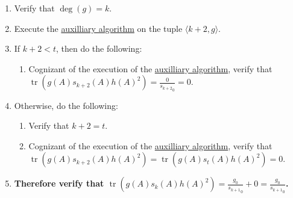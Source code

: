 \documentclass[twocolumn]{article}
\DeclareMathOperator{\tr}{tr}
\begin{document}
\begin{enumerate}
\begin{enumerate}
						\item Verify that $\deg(g)=k$.
						\item Execute the \hyperref[sec:algorithm 47 auxilliary algorithm]{auxilliary algorithm} on the tuple $\langle k+2,g\rangle$.
						\item If $k+2<t$, then do the following:
						\begin{enumerate}
							\item Cognizant of the execution of the \hyperref[sec:algorithm 47 auxilliary algorithm]{auxilliary algorithm}, verify that $\tr(g(A)s_{k+2}(A)h(A)^2)=\frac{0}{{s_{k+2}}_0}=0$.
						\end{enumerate}
						\item Otherwise, do the following:
						\begin{enumerate}
							\item Verify that $k+2=t$.
							\item Cognizant of the execution of the \hyperref[sec:algorithm 47 auxilliary algorithm]{auxilliary algorithm}, verify that $\tr(g(A)s_{k+2}(A)h(A)^2)=\tr(g(A)s_t(A)h(A)^2)=0$.
						\end{enumerate}
						\item \textbf{Therefore verify that $\tr(g(A)s_k(A)h(A)^2)=\frac{g_0}{{s_{k+1}}_0}+0=\frac{g_0}{{s_{k+1}}_0}$.}
					\end{enumerate}
				\end{enumerate}
\end{document}
